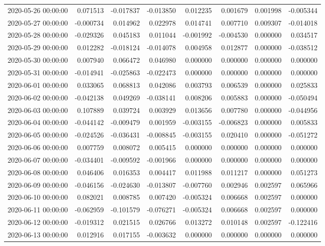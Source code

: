 \begin{tabular}{lrrrrrrr}
2020-05-26 00:00:00 & 0.071513 & -0.017837 & -0.013850 & 0.012235 & 0.001679 & 0.001998 & -0.005344 \\
2020-05-27 00:00:00 & -0.000734 & 0.014962 & 0.022978 & 0.014741 & 0.007710 & 0.009307 & -0.014018 \\
2020-05-28 00:00:00 & -0.029326 & 0.045183 & 0.011044 & -0.001992 & -0.004530 & 0.000000 & 0.034517 \\
2020-05-29 00:00:00 & 0.012282 & -0.018124 & -0.014078 & 0.004958 & 0.012877 & 0.000000 & -0.038512 \\
2020-05-30 00:00:00 & 0.007940 & 0.066472 & 0.046980 & 0.000000 & 0.000000 & 0.000000 & 0.000000 \\
2020-05-31 00:00:00 & -0.014941 & -0.025863 & -0.022473 & 0.000000 & 0.000000 & 0.000000 & 0.000000 \\
2020-06-01 00:00:00 & 0.033065 & 0.068813 & 0.042086 & 0.003793 & 0.006539 & 0.000000 & 0.025833 \\
2020-06-02 00:00:00 & -0.042138 & 0.049269 & -0.038141 & 0.008206 & 0.005883 & 0.000000 & -0.050494 \\
2020-06-03 00:00:00 & 0.107889 & 0.039724 & 0.003929 & 0.013656 & 0.007780 & 0.000000 & -0.044956 \\
2020-06-04 00:00:00 & -0.044142 & -0.009479 & 0.001959 & -0.003155 & -0.006823 & 0.000000 & 0.005833 \\
2020-06-05 00:00:00 & -0.024526 & -0.036431 & -0.008845 & -0.003155 & 0.020410 & 0.000000 & -0.051272 \\
2020-06-06 00:00:00 & 0.007759 & 0.008072 & 0.005415 & 0.000000 & 0.000000 & 0.000000 & 0.000000 \\
2020-06-07 00:00:00 & -0.034401 & -0.009592 & -0.001966 & 0.000000 & 0.000000 & 0.000000 & 0.000000 \\
2020-06-08 00:00:00 & 0.046406 & 0.016353 & 0.004417 & 0.011988 & 0.011217 & 0.000000 & 0.051273 \\
2020-06-09 00:00:00 & -0.046156 & -0.024630 & -0.013807 & -0.007760 & 0.002946 & 0.002597 & 0.065966 \\
2020-06-10 00:00:00 & 0.082021 & 0.008785 & 0.007420 & -0.005324 & 0.006668 & 0.002597 & 0.000000 \\
2020-06-11 00:00:00 & -0.062959 & -0.101579 & -0.076271 & -0.005324 & 0.006668 & 0.002597 & 0.000000 \\
2020-06-12 00:00:00 & -0.019312 & 0.021515 & 0.026766 & 0.013272 & 0.010148 & 0.002597 & -0.122416 \\
2020-06-13 00:00:00 & 0.012916 & 0.017155 & -0.003632 & 0.000000 & 0.000000 & 0.000000 & 0.000000 \\

\end{tabular}
